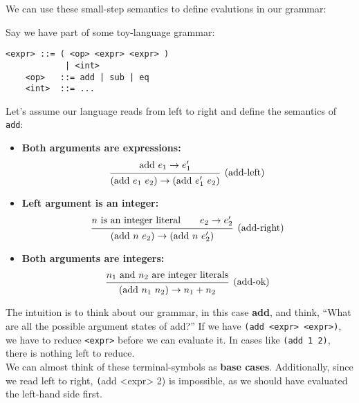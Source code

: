 \newpage

\noindent
We can use these small-step semantics to define evalutions in our grammar:

\begin{Example}
    
    \label{ex:small-step-semantics}
    Say we have part of some toy-language grammar:
    \begin{lstlisting}[numbers=none]
    <expr> ::= ( <op> <expr> <expr> )
            | <int>
    <op>   ::= add | sub | eq
    <int>  ::= ...
    \end{lstlisting}

    \noindent
    Let's assume our language reads from left to right and define the semantics of \texttt{add}:
    \begin{itemize}
        \item \textbf{Both arguments are expressions:}
        \[
        \begin{prooftree}
        \hypo{\text{add}\ e_1 \rightarrow e_1'}
        \Infer1[\text{(add-left)}]{ (\text{add}\ e_1\ e_2) \rightarrow (\text{add}\ e_1'\ e_2) }
        \end{prooftree}
        \]
        \item \textbf{Left argument is an integer:}
        \[
        \begin{prooftree}
        \hypo{n \text{ is an integer literal}\qquad e_2 \rightarrow e_2'}
        \Infer1[\text{(add-right)}]{ (\text{add}\ n\ e_2) \rightarrow (\text{add}\ n\ e_2') }
        \end{prooftree}
        \]
        \item \textbf{Both arguments are integers:}
        \[
        \begin{prooftree}
        \hypo{n_1 \text{ and } n_2 \text{ are integer literals}}
        \Infer1[\text{(add-ok)}]{ (\text{add}\ n_1\ n_2) \rightarrow n_1 + n_2 }
        \end{prooftree}
        \]
    \end{itemize}

    \noindent
    The intuition is to think about our grammar, in this case \textbf{add}, and think, ``What are all the possible argument states of add?''
    If we have \texttt{(add <expr> <expr>)}, we have to reduce \texttt{<expr>} before we can evaluate it. In cases like 
    \texttt{(add 1 2)}, there is nothing left to reduce.\\

    \noindent
    We can almost think of these terminal-symbols as \textbf{base cases}.
    Additionally, since we read left to right, \texttt(add <expr> 2) is impossible, as we should have evaluated the left-hand side first.

\end{Example}
        
